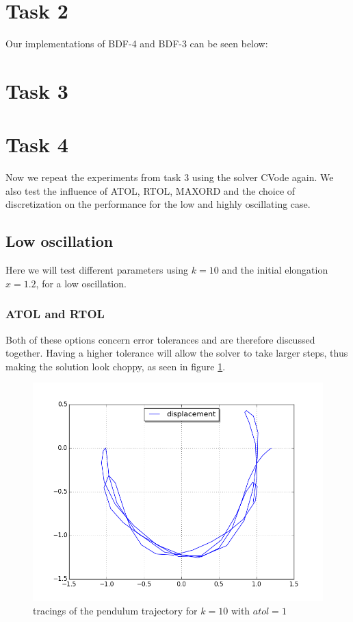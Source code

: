 \documentclass[a4paper,11pt]{article}
\theoremstyle{mytheor}
\begin{document}
\section*{Task 2}
Our implementations of BDF-4 and BDF-3 can be seen below:


\section*{Task 3}

\section*{Task 4}
Now we repeat the experiments from task 3 using the solver CVode again. We also test the influence of ATOL, RTOL, MAXORD and the choice of discretization on the performance for the low and highly oscillating case.

\subsection*{Low oscillation}
Here we will test different parameters using $k = 10$ and the initial elongation $x = 1.2$, for a low oscillation.

\subsubsection*{ATOL and RTOL}


Both of these options concern error tolerances and are therefore discussed together. Having a higher tolerance will allow the solver to take larger steps, thus making the solution look choppy, as seen in figure \ref{3k10at01}.

\begin{figure}[!h]
\centering
\includegraphics[scale=0.5]{task1_k10_utdrag12_atol01.png}
\caption{tracings of the pendulum trajectory for $k = 10$ with $atol = 1$}
\label{3k10at01}
\end{figure}
\end{document}
